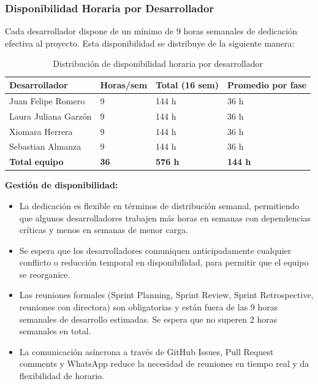 \documentclass{article}
\begin{document}
\subsubsection{Disponibilidad Horaria por Desarrollador}

Cada desarrollador dispone de un mínimo de 9 horas semanales de dedicación efectiva al proyecto. Esta disponibilidad se distribuye de la siguiente manera:

\begin{table}[H]
\centering
\small
\begin{tabular}{|p{3cm}|p{1.8cm}|p{2cm}|p{2.5cm}|}
\hline
\textbf{Desarrollador} & \textbf{Horas/sem} & \textbf{Total (16 sem)} & \textbf{Promedio por fase} \\
\hline
Juan Felipe Romero & 9 & 144 h & 36 h \\
\hline
Laura Juliana Garzón & 9 & 144 h & 36 h \\
\hline
Xiomara Herrera & 9 & 144 h & 36 h \\
\hline
Sebastian Almanza & 9 & 144 h & 36 h \\
\hline
\textbf{Total equipo} & \textbf{36} & \textbf{576 h} & \textbf{144 h} \\
\hline
\end{tabular}
\caption{Distribución de disponibilidad horaria por desarrollador}
\label{tab:disponibilidad}
\end{table}

\textbf{Gestión de disponibilidad:}

\begin{itemize}
    \item La dedicación es flexible en términos de distribución semanal, permitiendo que algunos desarrolladores trabajen más horas en semanas con dependencias críticas y menos en semanas de menor carga.
    
    \item Se espera que los desarrolladores comuniquen anticipadamente cualquier conflicto o reducción temporal en disponibilidad, para permitir que el equipo se reorganice.
    
    \item Las reuniones formales (Sprint Planning, Sprint Review, Sprint Retrospective, reuniones con directora) son obligatorias y están fuera de las 9 horas semanales de desarrollo estimadas. Se espera que no superen 2 horas semanales en total.
    
    \item La comunicación asíncrona a través de GitHub Issues, Pull Request comments y WhatsApp reduce la necesidad de reuniones en tiempo real y da flexibilidad de horario.
\end{itemize}
\end{document}
